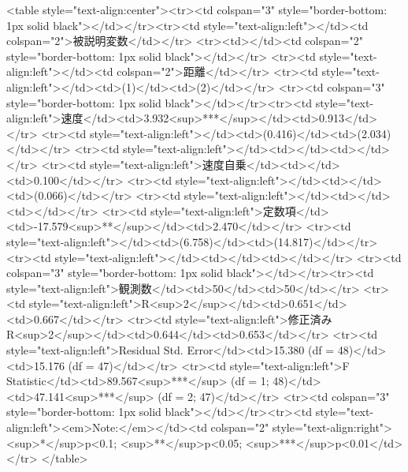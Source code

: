 
<table style="text-align:center"><tr><td colspan="3" style="border-bottom: 1px solid black"></td></tr><tr><td style="text-align:left"></td><td colspan="2">被説明変数</td></tr>
<tr><td></td><td colspan="2" style="border-bottom: 1px solid black"></td></tr>
<tr><td style="text-align:left"></td><td colspan="2">距離</td></tr>
<tr><td style="text-align:left"></td><td>(1)</td><td>(2)</td></tr>
<tr><td colspan="3" style="border-bottom: 1px solid black"></td></tr><tr><td style="text-align:left">速度</td><td>3.932<sup>***</sup></td><td>0.913</td></tr>
<tr><td style="text-align:left"></td><td>(0.416)</td><td>(2.034)</td></tr>
<tr><td style="text-align:left"></td><td></td><td></td></tr>
<tr><td style="text-align:left">速度自乗</td><td></td><td>0.100</td></tr>
<tr><td style="text-align:left"></td><td></td><td>(0.066)</td></tr>
<tr><td style="text-align:left"></td><td></td><td></td></tr>
<tr><td style="text-align:left">定数項</td><td>-17.579<sup>**</sup></td><td>2.470</td></tr>
<tr><td style="text-align:left"></td><td>(6.758)</td><td>(14.817)</td></tr>
<tr><td style="text-align:left"></td><td></td><td></td></tr>
<tr><td colspan="3" style="border-bottom: 1px solid black"></td></tr><tr><td style="text-align:left">観測数</td><td>50</td><td>50</td></tr>
<tr><td style="text-align:left">R<sup>2</sup></td><td>0.651</td><td>0.667</td></tr>
<tr><td style="text-align:left">修正済み R<sup>2</sup></td><td>0.644</td><td>0.653</td></tr>
<tr><td style="text-align:left">Residual Std. Error</td><td>15.380 (df = 48)</td><td>15.176 (df = 47)</td></tr>
<tr><td style="text-align:left">F Statistic</td><td>89.567<sup>***</sup> (df = 1; 48)</td><td>47.141<sup>***</sup> (df = 2; 47)</td></tr>
<tr><td colspan="3" style="border-bottom: 1px solid black"></td></tr><tr><td style="text-align:left"><em>Note:</em></td><td colspan="2" style="text-align:right"><sup>*</sup>p<0.1; <sup>**</sup>p<0.05; <sup>***</sup>p<0.01</td></tr>
</table>
